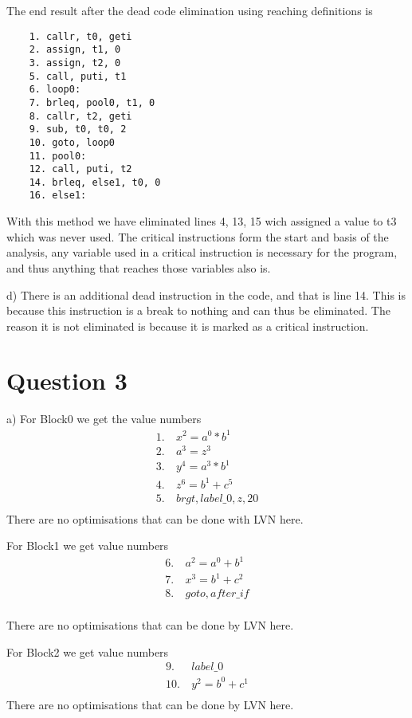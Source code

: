 \documentclass{article}
\begin{document}
The end result after the dead code elimination using reaching definitions is

\begin{lstlisting}
    1. callr, t0, geti
    2. assign, t1, 0
    3. assign, t2, 0
    5. call, puti, t1
    6. loop0:
    7. brleq, pool0, t1, 0
    8. callr, t2, geti
    9. sub, t0, t0, 2
    10. goto, loop0
    11. pool0:
    12. call, puti, t2
    14. brleq, else1, t0, 0
    16. else1:
\end{lstlisting}

With this method we have eliminated lines 4, 13, 15 wich assigned a value to
t3 which was never used. The critical instructions form the start and basis of
the analysis, any variable used in a critical instruction is necessary for the
program, and thus anything that reaches those variables also is.

d) There is an additional dead instruction in the code, and that is line 14.
This is because this instruction is a break to nothing and can thus be
eliminated. The reason it is not eliminated is because it is marked as a
critical instruction.

\section*{Question 3}
a)
For Block0 we get the value numbers
\begin{align*}
    1. \  & x^2 = a^0 * b^1     \\
    2. \  & a^3 = z^3           \\
    3. \  & y^4 = a^3 * b^1     \\
    4. \  & z^6 = b^1 + c^5     \\
    5. \  & brgt, label\_0,z,20 \\
\end{align*}
There are no optimisations that can be done with LVN here.

For Block1 we get value numbers
\begin{align*}
    6.\  & a^2 = a^0 + b^1 \\
    7.\  & x^3 = b^1 + c^2 \\
    8.\  & goto, after\_if \\
\end{align*}

There are no optimisations that can be done by LVN here.

For Block2 we get value numbers
\begin{align*}
    9.\   & label\_0        \\
    10.\  & y^2 = b^0 + c^1 \\
\end{align*}
There are no optimisations that can be done by LVN here.
\end{document}
